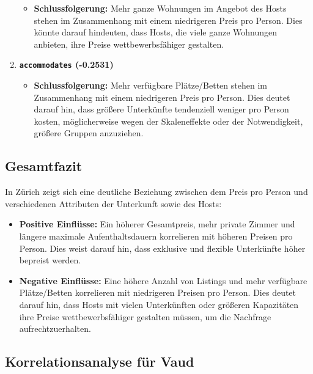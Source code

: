 \documentclass[
  journal,
]{IEEEtran}%
\providecommand{\tightlist}{%
  \setlength{\itemsep}{0pt}\setlength{\parskip}{0pt}}\usepackage{longtable,booktabs,array}
\begin{document}
\begin{enumerate}
  \begin{itemize}
  \tightlist
  \item
    \textbf{Schlussfolgerung:} Mehr ganze Wohnungen im Angebot des Hosts
    stehen im Zusammenhang mit einem niedrigeren Preis pro Person. Dies
    könnte darauf hindeuten, dass Hosts, die viele ganze Wohnungen
    anbieten, ihre Preise wettbewerbsfähiger gestalten.
  \end{itemize}
\item
  \textbf{\texttt{accommodates} (-0.2531)}

  \begin{itemize}
  \tightlist
  \item
    \textbf{Schlussfolgerung:} Mehr verfügbare Plätze/Betten stehen im
    Zusammenhang mit einem niedrigeren Preis pro Person. Dies deutet
    darauf hin, dass größere Unterkünfte tendenziell weniger pro Person
    kosten, möglicherweise wegen der Skaleneffekte oder der
    Notwendigkeit, größere Gruppen anzuziehen.
  \end{itemize}
\end{enumerate}

\subsection{Gesamtfazit}\label{gesamtfazit}

In Zürich zeigt sich eine deutliche Beziehung zwischen dem Preis pro
Person und verschiedenen Attributen der Unterkunft sowie des Hosts:

\begin{itemize}
\item
  \textbf{Positive Einflüsse:} Ein höherer Gesamtpreis, mehr private
  Zimmer und längere maximale Aufenthaltsdauern korrelieren mit höheren
  Preisen pro Person. Dies weist darauf hin, dass exklusive und flexible
  Unterkünfte höher bepreist werden.
\item
  \textbf{Negative Einflüsse:} Eine höhere Anzahl von Listings und mehr
  verfügbare Plätze/Betten korrelieren mit niedrigeren Preisen pro
  Person. Dies deutet darauf hin, dass Hosts mit vielen Unterkünften
  oder größeren Kapazitäten ihre Preise wettbewerbsfähiger gestalten
  müssen, um die Nachfrage aufrechtzuerhalten.
\end{itemize}

\subsection{\texorpdfstring{\textbf{Korrelationsanalyse für
Vaud}}{Korrelationsanalyse für Vaud}}\label{korrelationsanalyse-fuxfcr-vaud}
\end{document}
